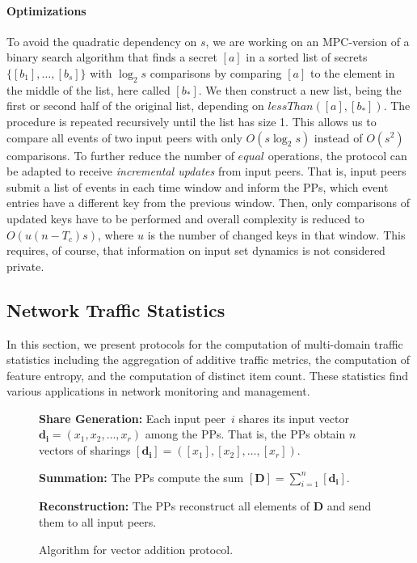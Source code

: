 \documentclass[letterpaper,11pt,onecolumn,titlepage]{article}
\begin{document}
\paragraph{Optimizations} To avoid the quadratic dependency on $s$, we are working on an MPC-version of
a binary search algorithm that finds a secret $[a]$ in a sorted list of secrets $\{[b_1], \ldots, [b_s]\}$ with $\log_2 s$ comparisons by 
comparing $[a]$ to the element in the middle of the list, here called $[b_*]$. We then construct a new list, being
the first or second half of the original list, depending on $lessThan([a],[b_*])$. The procedure is repeated recursively until the list has size 1.
This allows us to compare all events of two input peers with only $O(s \log_2 s)$ instead of $O(s^2)$ comparisons.
To further reduce the number of $equal$ operations, the protocol can be adapted
to receive \emph{incremental updates} from input peers. That is, input peers submit a list of events in each time window and
inform the PPs, which event entries have a different key from the previous window. Then, only comparisons of updated keys have to be performed and overall complexity is reduced to $O(u(n-T_c)s)$, where $u$ is the number of changed keys in that window. This requires, of course, that information on input set dynamics is not considered private.

\subsection{Network Traffic Statistics}
\label{sec:statistics}

In this section, we present protocols for the computation of multi-domain traffic statistics including
the aggregation of additive traffic metrics, the computation of feature entropy, and the computation of
distinct item count. These statistics find various applications in network monitoring and management.

\begin{figure}[t]
	\begin{boxedminipage}{1\textwidth}
	\begin{small}
	\begin{compactenum}
		\item \textbf{Share Generation:} Each input peer~$i$ shares its input vector $\mathbf{d_i}=(x_1, x_2, \ldots, x_r)$ among the PPs. That is, the PPs obtain $n$ vectors of sharings $[\mathbf{d_i}] = ([x_1], [x_2], \ldots, [x_r])$.
		\item \textbf{Summation:} The PPs compute the sum $[\mathbf{D}] = \sum_{i=1}^{n}{[\mathbf{d_i}]}$.
		\item \textbf{Reconstruction:} The PPs reconstruct all elements of $\mathbf{D}$ and send them to all input peers.
	\end{compactenum}
	\end{small}
	\end{boxedminipage}
	\caption{Algorithm for vector addition protocol.}
	\label{box:addition}
\end{figure}
\end{document}

